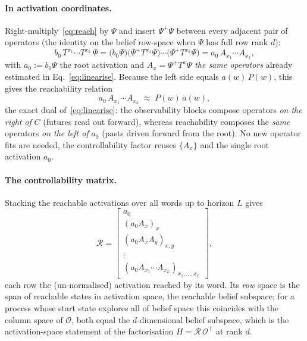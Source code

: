 \documentclass[11pt]{article}
\begin{document}
\paragraph{In activation coordinates.}
Right-multiply~\eqref{eq:reach} by $\Psi$ and insert $\Psi^{+}\Psi$ between every adjacent
pair of operators (the identity on the belief row-space when $\Psi$ has full row rank $d$):
\[
b_0\,T^{x_1}\!\cdots T^{x_k}\,\Psi
= \big(b_0\Psi\big)\big(\Psi^{+}T^{x_1}\Psi\big)\cdots\big(\Psi^{+}T^{x_k}\Psi\big)
= a_0\,A_{x_1}\!\cdots A_{x_k},
\]
with $a_0:=b_0\Psi$ the root activation and $A_x=\Psi^{+}T^{x}\Psi$ \emph{the same operators}
already estimated in Eq.~\eqref{eq:linearise}. Because the left side equals $a(w)\,P(w)$, this
gives the reachability relation
\begin{equation}
a_0\,A_{x_1}\!\cdots A_{x_k} \;\approx\; P(w)\,a(w),
\label{eq:reach-act}
\end{equation}
the exact dual of~\eqref{eq:linearise}: the observability blocks compose operators \emph{on the
right of} $C$ (futures read out forward), whereas reachability composes the \emph{same} operators
\emph{on the left of} $a_0$ (pasts driven forward from the root). No new operator fits are needed,
the controllability factor reuses $\{A_x\}$ and the single root activation $a_0$.

\paragraph{The controllability matrix.}
Stacking the reachable activations over all words up to horizon $L$ gives
\begin{equation}
\mathcal{R}=
\begin{bmatrix}
a_0\\[2pt]
(a_0 A_x)_{x}\\[2pt]
(a_0 A_x A_y)_{x,y}\\[2pt]
\vdots\\[2pt]
(a_0 A_{x_1}\!\cdots A_{x_L})_{x_1,\dots,x_L}
\end{bmatrix},
\label{eq:reachmat}
\end{equation}
each row the (un-normalised) activation reached by its word. Its \emph{row} space is the span of
reachable states in activation space, the reachable belief subspace; for a process whose start
state explores all of belief space this coincides with the column space of $\mathcal{O}$, both
equal the $d$-dimensional belief subspace, which is the activation-space statement of the
factorisation $H=\mathcal{R}\,\mathcal{O}^{\!\top}$ at rank $d$.
\end{document}
